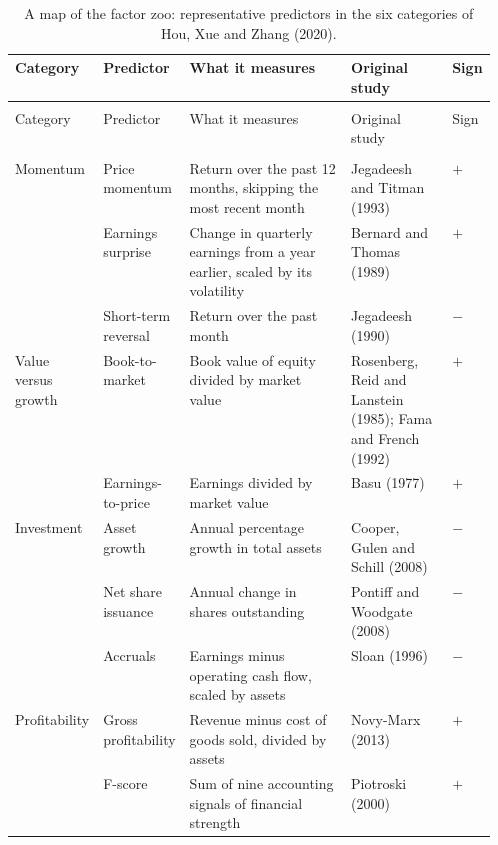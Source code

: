 \renewcommand{\arraystretch}{1.15}
\setlength{\LTpre}{6pt}\setlength{\LTpost}{6pt}
\begin{longtable}{@{}>{\raggedright\arraybackslash}p{0.13\linewidth}>{\raggedright\arraybackslash}p{0.17\linewidth}>{\raggedright\arraybackslash}p{}>{\raggedright\arraybackslash}p{0.21\linewidth}>{\centering\arraybackslash}p{0.05\linewidth}@{}}
\caption{A map of the factor zoo: representative predictors in the six categories of Hou, Xue and Zhang (2020).}
\label{tab:19-zoo} \\
\toprule
Category & Predictor & What it measures & Original study & Sign \\
\midrule
\endfirsthead
\multicolumn{5}{@{}l}{\emph{(continued)}} \\
\toprule
Category & Predictor & What it measures & Original study & Sign \\
\midrule
\endhead
\midrule
\multicolumn{5}{r@{}}{\emph{(continued on the next page)}} \\
\endfoot
\bottomrule
\endlastfoot
Momentum & Price momentum & Return over the past 12 months, skipping the most recent month & Jegadeesh and Titman (1993) & $+$ \\
 & Earnings surprise & Change in quarterly earnings from a year earlier, scaled by its volatility & Bernard and Thomas (1989) & $+$ \\
 & Short-term reversal & Return over the past month & Jegadeesh (1990) & $-$ \\
\addlinespace
Value versus growth & Book-to-market & Book value of equity divided by market value & Rosenberg, Reid and Lanstein (1985); Fama and French (1992) & $+$ \\
 & Earnings-to-price & Earnings divided by market value & Basu (1977) & $+$ \\
\addlinespace
Investment & Asset growth & Annual percentage growth in total assets & Cooper, Gulen and Schill (2008) & $-$ \\
 & Net share issuance & Annual change in shares outstanding & Pontiff and Woodgate (2008) & $-$ \\
 & Accruals & Earnings minus operating cash flow, scaled by assets & Sloan (1996) & $-$ \\
\addlinespace
Profitability & Gross profitability & Revenue minus cost of goods sold, divided by assets & Novy-Marx (2013) & $+$ \\
 & F-score & Sum of nine accounting signals of financial strength & Piotroski (2000) & $+$ \\

\end{longtable}
